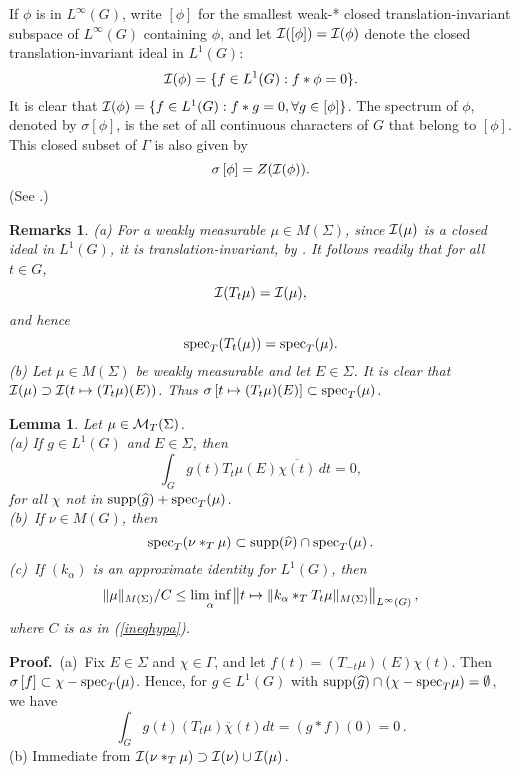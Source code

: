 \documentclass[12pt]{article}
\renewcommand{\liminf}{\mathop{\hbox{\rm lim inf}}\limits}
\newcommand{\cI}{{\cal I}}
\newcommand{\Linfg}{L^\infty (G)}
\newcommand{\spec}{{\rm spec}}
\newcommand{\cM}{{\cal M}}
\newtheorem{lemma}[defin]{Lemma}
\newtheorem{rem}[defin]{Remarks}
\begin{document}
If 
$\phi$ is in $\Linfg$, write $\left[ \phi\right]$ 
for the smallest weak-* closed translation-invariant subspace of $\Linfg$ 
containing $\phi$, and let $\cI([\phi])=\cI (\phi)$ 
denote the closed translation-invariant ideal in $L^1(G)$:\\
$$ \cI (\phi)=\{f\in L^1(G): f*\phi=0\}.$$
It is clear that 
$ \cI (\phi)=\{f\in L^1(G): f*g=0, \forall g\in \left[\phi\right]\}$. 
The spectrum of $\phi$, denoted by 
$\sigma \left[\phi\right]$, 
is the set of all continuous characters of $G$ 
that belong to $\left[\phi\right]$.  
This closed subset of $\Gamma$ is also given by 
\begin{equation}
\sigma \left[\phi\right]=Z(\cI(\phi)). 
\label{spec}
\end{equation}
(See \cite[Chapter 7, Theorem 7.8.2, (b), (c), and (d)]{rudin}.)  
\begin{rem}
{\rm  
(a)  For a weakly measurable $\mu\in M(\Sigma)$, since $\cI(\mu)$ is a closed ideal
in $L^1(G)$, it is translation-invariant, by
\cite[Theorem 7.1.2]{rudin}.
It follows readily that 
for all $t\in G$,
$$\cI(T_t\mu)=\cI(\mu),$$
and hence
\begin{equation}
{\rm spec}_T (T_t(\mu))={\rm spec}_T (\mu).
\label{feb.4.95}
\end{equation}
(b)  Let $\mu\in M(\Sigma)$ be weakly measurable and let $E\in \Sigma$. 
It is clear that $\cI(\mu)\supset\cI(t\mapsto (T_t\mu)(E))$.  Thus
$\sigma\left[ t\mapsto (T_t\mu)(E)\right]\subset  \spec_T(\mu)$.



}
\label{rem1/28.6}
\end{rem}




\begin{lemma}
Let $\mu\in \cM_T(\Sigma)$.\\
(a)  If $g\in L^1(G)$ and $E\in \Sigma$, then
$$\int_G g(t)T_t\mu(E)\overline{\chi(t)}\,dt=0,$$
for all $\chi$ not in ${\rm supp}(\widehat{g})+\spec_T(\mu)$.\\
(b)\  If $\nu\in M(G)$, then 
$$\spec_T(\nu*_T\mu)\subset {\rm supp}(\widehat{\nu})\cap   \spec_T(\mu)\,.$$
(c)\  If $(k_\alpha)$ is an approximate identity for $L^1(G)$, then 
$$\|\mu\|_{M(\Sigma)}/C\leq \liminf_\alpha \left\|
t\mapsto \|k_\alpha *_T T_t\mu\|_{M(\Sigma)}\right \|_{L^\infty(G)}, $$
where $C$ is as in (\ref{ineqhypa}).
\label{ref1}
\end{lemma}
{\bf Proof.}\ (a)\ Fix $E\in\Sigma$ and $\chi\in\Gamma$, and let
$f(t)=(T_{-t}\mu)(E)\chi(t)$.
Then $\sigma\left[ f\right]\subset \chi -\spec_T(\mu)$.
Hence, for $g\in L^1(G)$ with 
$\mbox{supp}(\widehat{g})\cap (\chi-\spec_T\mu)=\emptyset$,
we have
$$\int_Gg(t)(T_t\mu)\overline{\chi}(t)dt=(g*f)(0)=0\,.$$
(b)  Immediate from $\cI(\nu*_T\mu)\supset \cI(\nu)\cup\cI(\mu)\,.$
\end{document}
